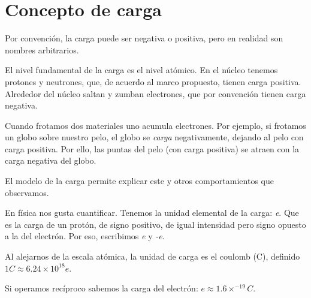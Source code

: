 \section{Concepto de carga}

Por convención,
la carga puede ser negativa o positiva,
pero en realidad son nombres arbitrarios.

El nivel fundamental de la carga es el nivel atómico.
En el núcleo tenemos protones y neutrones,
que, de acuerdo al marco propuesto, tienen carga positiva.
Alrededor del núcleo saltan y zumban electrones,
que por convención tienen carga negativa.

Cuando frotamos dos materiales uno acumula electrones.
Por ejemplo, si frotamos un globo sobre nuestro pelo,
el globo se \textit{carga} negativamente,
dejando al pelo con carga positiva.
Por ello,
las puntas del pelo (con carga positiva) 
se atraen con la carga negativa del globo.

El modelo de la carga permite explicar este y otros 
comportamientos que observamos.

En física nos gusta cuantificar.
Tenemos la unidad elemental de la carga: \textit{e}.
Que es la carga de un protón,
de signo positivo,
de igual intensidad pero signo opuesto a la del electrón.
Por eso,
escribimos \textit{e} y \textit{-e}.

Al alejarnos de la escala atómica, 
la unidad de carga es el coulomb (C),
definido \(1 C \approx 6.24 \times 10^{18} e\).

Si operamos recíproco sabemos la carga del electrón: 
\(e \approx 1.6 \times^{-19} C\).